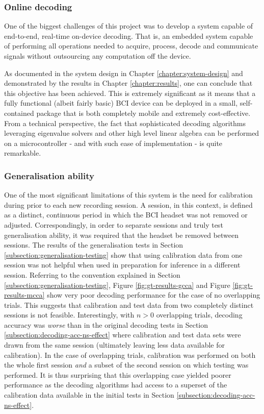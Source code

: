 \subsubsection{Online decoding}
One of the biggest challenges of this project was to develop a system capable of end-to-end, real-time on-device decoding. That is, an embedded system capable of performing all operations needed to acquire, process, decode and communicate signals without outsourcing any computation off the device. 

As documented in the system design in Chapter \ref{chapter:system-design} and demonstrated by the results in Chapter \ref{chapter:results}, one can conclude that this objective has been achieved. This is extremely significant as it means that a fully functional (albeit fairly basic) BCI device can be deployed in a small, self-contained package that is both completely mobile and extremely cost-effective. From a technical perspective, the fact that sophisticated decoding algorithms leveraging eigenvalue solvers and other high level linear algebra can be performed on a microcontroller - and with such ease of implementation - is quite remarkable.  

\subsubsection{Generalisation ability}
One of the most significant limitations of this system is the need for calibration during prior to each new recording session. A session, in this context, is defined as a distinct, continuous period in which the BCI headset was not removed or adjusted. Correspondingly, in order to separate sessions and truly test generalisation ability, it was required that the headset be removed between sessions. The results of the generalisation tests in Section \ref{subsection:generalisation-testing} show that using calibration data from one session was not helpful when used in preparation for inference in a different session. Referring to the convention explained in Section \ref{subsection:generalisation-testing}, Figure \ref{fig:gt-results-gcca} and Figure \ref{fig:gt-results-mcca} show very poor decoding performance for the case of no overlapping trials. This suggests that calibration and test data from two completely distinct sessions is not feasible. Interestingly, with $n>0$ overlapping trials, decoding accuracy was \textit{worse} than in the original decoding tests in Section \ref{subsection:decoding-acc-ns-effect} where calibration and test data sets were drawn from the same session (ultimately leaving less data available for calibration). In the case of overlapping trials, calibration was performed on both the whole first session \textit{and} a subset of the second session on which testing was performed. It is thus surprising that this overlapping case yielded poorer performance as the decoding algorithms had access to a superset of the calibration data available in the initial tests in Section \ref{subsection:decoding-acc-ns-effect}. 

